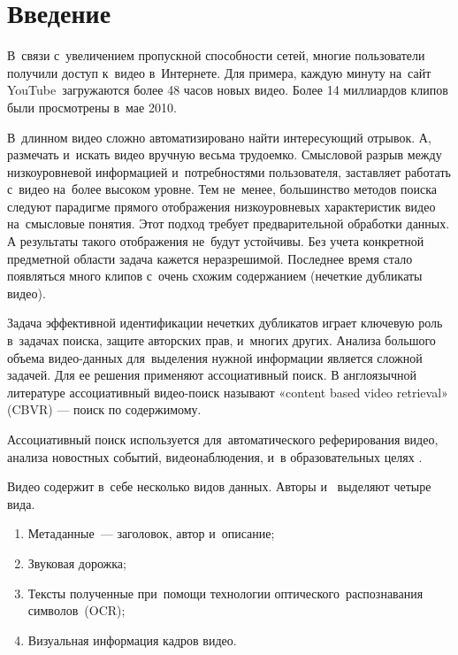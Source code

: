 \pagebreak


\section{Введение}

В~связи с~увеличением пропускной способности сетей,
многие пользователи получили доступ к~видео в~Интернете.
Для примера, каждую минуту на~сайт YouTube\  загружаются
более 48 часов новых видео.
Более 14 миллиардов клипов были просмотрены в~мае 2010.

В~длинном видео сложно автоматизировано найти интересующий отрывок.
А, размечать и~искать видео вручную весьма трудоемко.
Смысловой разрыв между низкоуровневой информацией
и~потребностями пользователя, заставляет работать
с~видео на~более высоком уровне.
Тем не~менее, большинство методов поиска следуют парадигме
прямого отображения низкоуровневых характеристик видео
на~смысловые понятия.
Этот подход требует предварительной обработки данных.
А результаты такого отображения не~будут устойчивы.
Без учета конкретной предметной области задача кажется неразрешимой.
Последнее время стало появляться много клипов
с~очень схожим содержанием (нечеткие дубликаты видео).

Задача эффективной идентификации нечетких дубликатов играет ключевую
роль в~задачах поиска, защите авторских прав, и~многих других.
Анализа большого объема видео-данных для~выделения нужной
информации является сложной задачей.
Для ее решения применяют ассоциативный поиск.
В англоязычной литературе ассоциативный видео-поиск называют
«content based video retrieval» (CBVR) —
поиск по содержимому.

Ассоциативный поиск используется для~автоматического
реферирования видео, анализа новостных событий,
видеонаблюдения, и~в образовательных целях \cite{Dimitrova:2002}.

Видео содержит в~себе несколько видов данных.
Авторы \cite{Chung:2007:PAU} и~\cite{smeaton:2006} выделяют четыре вида.
\begin{enumerate}
    \item Метаданные~— заголовок, автор и~описание;
    \item Звуковая дорожка;
    \item Тексты полученные при~помощи технологии
          оптического\
          распознавания символов\
          (OCR);
    \item Визуальная информация кадров видео.
\end{enumerate}


